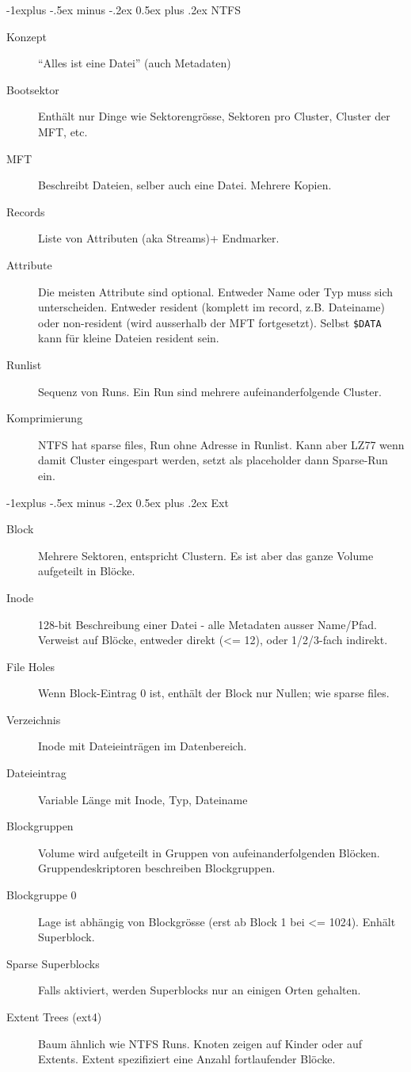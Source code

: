\documentclass[10pt,landscape,a4paper]{article}
\makeatletter
\renewcommand{\subsection}{\@startsection{subsection}{2}{0mm}%
                                {-1explus -.5ex minus -.2ex}%
                                {0.5ex plus .2ex}%
                                {\normalfont\small\bfseries}}
\makeatother
\begin{document}
\begin{multicols*}{3}
\columnbreak

\subsection{NTFS}

\begin{description}
  \item[Konzept] ``Alles ist eine Datei'' (auch Metadaten)
  \item[Bootsektor] Enthält nur Dinge wie Sektorengrösse, Sektoren pro Cluster,
    Cluster der MFT, etc.
  \item[MFT] Beschreibt Dateien, selber auch eine Datei. Mehrere Kopien.
  \item[Records] Liste von Attributen (aka Streams)+ Endmarker.
  \item[Attribute] Die meisten Attribute sind optional. Entweder Name oder Typ
    muss sich unterscheiden. Entweder resident (komplett im record, z.B.
    Dateiname) oder non-resident (wird ausserhalb der MFT fortgesetzt).
    Selbst \verb|$DATA| kann für kleine Dateien resident sein.
  \item[Runlist] Sequenz von Runs. Ein Run sind mehrere aufeinanderfolgende
    Cluster.
  \item[Komprimierung] NTFS hat sparse files, Run ohne Adresse in Runlist. Kann
    aber LZ77 wenn damit Cluster eingespart werden, setzt als placeholder dann
    Sparse-Run ein.
\end{description}

\subsection{Ext}

\begin{description}
  \item[Block] Mehrere Sektoren, entspricht Clustern. Es ist aber das ganze Volume
    aufgeteilt in Blöcke.
  \item[Inode] 128-bit Beschreibung einer Datei - alle Metadaten ausser
    Name/Pfad. Verweist auf Blöcke, entweder direkt (<= 12), oder 1/2/3-fach indirekt.
  \item[File Holes] Wenn Block-Eintrag 0 ist, enthält der Block nur Nullen; wie
    sparse files.
  \item[Verzeichnis] Inode mit Dateieinträgen im Datenbereich.
  \item[Dateieintrag] Variable Länge mit Inode, Typ, Dateiname
  \item[Blockgruppen] Volume wird aufgeteilt in Gruppen von aufeinanderfolgenden
    Blöcken. Gruppendeskriptoren beschreiben Blockgruppen.
  \item[Blockgruppe 0] Lage ist abhängig von Blockgrösse (erst ab Block 1 bei <=
    1024). Enhält Superblock.
  \item[Sparse Superblocks] Falls aktiviert, werden Superblocks nur an einigen
    Orten gehalten.
  \item[Extent Trees (ext4)] Baum ähnlich wie NTFS Runs. Knoten zeigen auf
    Kinder oder auf Extents. Extent spezifiziert eine Anzahl fortlaufender Blöcke.
\end{description}


\end{multicols*}
\end{document}
